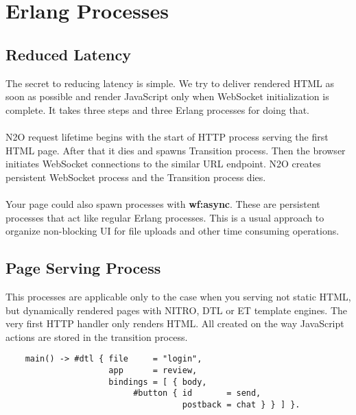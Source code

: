 \section{Erlang Processes}

\subsection{Reduced Latency}
The secret to reducing latency is simple. We try to deliver rendered HTML
as soon as possible and render JavaScript only when WebSocket initialization is complete.
It takes three steps and three Erlang processes for doing that.


\paragraph{}
N2O request lifetime begins with the start of HTTP process serving the first HTML page.
After that it dies and spawns Transition process.
Then the browser initiates WebSocket connections to the similar URL endpoint.
N2O creates persistent WebSocket process and the Transition process dies.

\paragraph{}
Your page could also spawn processes with {\bf wf:async}.
These are persistent processes that act like regular Erlang processes.
This is a usual approach to organize non-blocking UI for file uploads
and other time consuming operations.

\newpage
\subsection{Page Serving Process}
This processes are applicable only to the case when you serving not static HTML,
but dynamically rendered pages with NITRO, DTL or ET template engines.
The very first HTTP handler only renders HTML. All created on the way
JavaScript actions are stored in the transition process.

\vspace{1\baselineskip}
\begin{lstlisting}
    main() -> #dtl { file     = "login",
                     app      = review,
                     bindings = [ { body,
                          #button { id       = send,
                                    postback = chat } } ] }.
\end{lstlisting}
\vspace{1\baselineskip}

